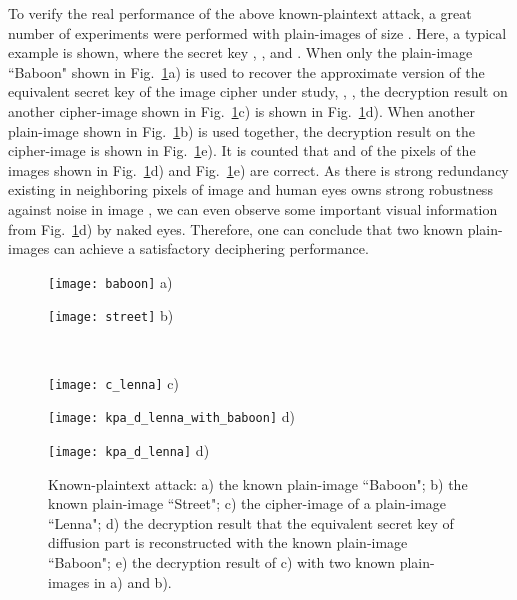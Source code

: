 \documentclass{ws-ijbc}
\newlength\twoimagewidth
\newlength\imagewidth
\begin{document}
To verify the real performance of the above known-plaintext attack,
a great number of experiments were performed with plain-images of size
. Here, a typical example is shown,
where the secret key
,
, and
.
When only the plain-image ``Baboon" shown in Fig.~\ref{figure:kp}a)
is used to recover the approximate version of the equivalent secret key of the image cipher under study,
, , the decryption
result on another cipher-image shown in Fig.~\ref{figure:kp}c) is shown in Fig.~\ref{figure:kp}d).
When another plain-image shown in Fig.~\ref{figure:kp}b) is used together, the decryption
result on the cipher-image is shown in Fig.~\ref{figure:kp}e). It is counted that  and 
of the pixels of the images shown in Fig.~\ref{figure:kp}d)
and Fig.~\ref{figure:kp}e) are correct.
As there is strong redundancy existing in neighboring pixels of image and human eyes owns strong robustness against noise in image \cite{Zhu:assessment:CASVT2015}, we can even observe some important visual information from Fig.~\ref{figure:kp}d) by naked eyes.
Therefore, one can conclude that two known plain-images can achieve a satisfactory deciphering performance.
\begin{figure}[!htb]
\centering
\begin{minipage}[t]{\twoimagewidth}
\centering
\texttt{[image: baboon]}
a)
\end{minipage}
\begin{minipage}[t]{\twoimagewidth}
\centering
\texttt{[image: street]}
b)
\end{minipage}
\\
\begin{minipage}[t]{\twoimagewidth}
\centering
\texttt{[image: c\_lenna]}
c)
\end{minipage}
\begin{minipage}[t]{\twoimagewidth}
\centering
\texttt{[image: kpa\_d\_lenna\_with\_baboon]}
d)
\end{minipage}
\begin{minipage}[t]{\twoimagewidth}
\centering
\texttt{[image: kpa\_d\_lenna]}
d)
\end{minipage}
\caption{Known-plaintext attack:
a) the known plain-image ``Baboon";
b) the known plain-image ``Street";
c) the cipher-image of a plain-image ``Lenna";
d) the decryption result that the equivalent secret key of diffusion part
is reconstructed with the known plain-image ``Baboon";
e) the decryption result of c) with two known plain-images in a) and b).}
\label{figure:kp}
\end{figure}
\end{document}
